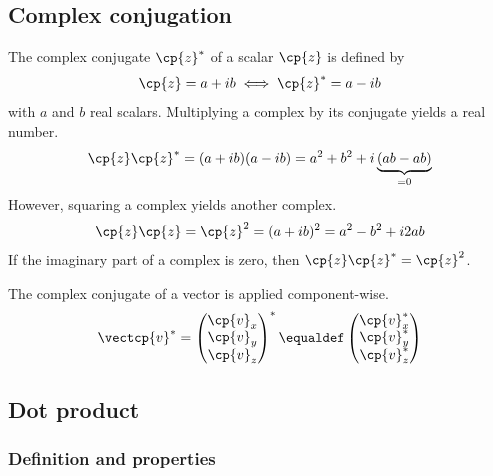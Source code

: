 
\subsection{Complex conjugation}
The complex conjugate $\cp{z}^*$ of a scalar $\cp{z}$ is defined by
\begin{equation}
    \cp{z} = a + ib \iff \cp{z}^* = a - ib
\end{equation}
with $a$ and $b$ real scalars.
Multiplying a complex by its conjugate yields a real number.
\begin{align}
    \cp{z}\cp{z}^* = (a + ib)(a - ib) = a^2 + b^2 + i\underbrace{(ab-ab)}_{=0}
\end{align}
However, squaring a complex yields another complex.
\begin{align}
    \cp{z}\cp{z} = \cp{z}^2 = (a + ib)^2 = a^2 - b^2 + i2ab
\end{align}
If the imaginary part of a complex is zero, then $\cp{z}\cp{z}^* = \cp{z}^2$.

The complex conjugate of a vector is applied component-wise.
\begin{equation}
    \vectcp{v}^*
    =
    \begin{pmatrix}
        \cp{v}_x \\ \cp{v}_y \\ \cp{v}_z
    \end{pmatrix}^*
    \equaldef
    \begin{pmatrix}
        \cp{v}_x^* \\ \cp{v}_y^* \\ \cp{v}_z^*
    \end{pmatrix}
\end{equation}







\subsection{Dot product}

\subsubsection{Definition and properties}

